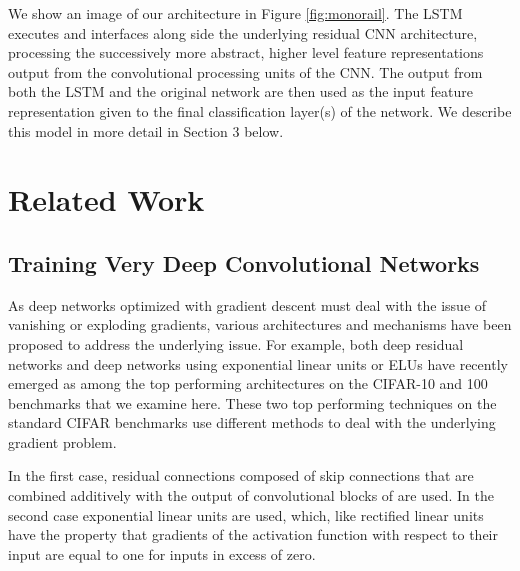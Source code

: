 \documentclass{article}
\begin{document}
We show an image of our architecture in Figure \ref{fig:monorail}. The LSTM executes and interfaces along side the underlying residual CNN architecture, processing the successively more abstract, higher level feature representations output from the convolutional processing units of the CNN. The output from both the LSTM and the original network are then used as the input feature representation given to the final classification layer(s) of the network. We describe this model in more detail in Section 3 below.




\section{Related Work}

\subsection{Training Very Deep Convolutional Networks} %

As deep networks optimized with gradient descent must deal with the issue of vanishing or exploding gradients, various architectures and mechanisms have been proposed to address the underlying issue. For example, both deep residual networks and deep networks using exponential linear units or ELUs have recently emerged as among the top performing architectures on the CIFAR-10 and 100 benchmarks that we examine here. These two top performing techniques on the standard CIFAR benchmarks use different methods to deal with the underlying gradient problem.

In the first case, residual connections composed of skip connections that are combined additively with the output of convolutional blocks of are used. In the second case exponential linear units are used, which, like rectified linear units have the property that gradients of the activation function with respect to their input are equal to one for inputs in excess of zero.
\end{document}
